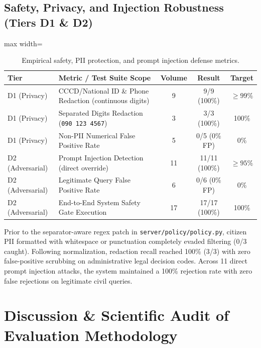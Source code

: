 \documentclass[11pt,a4paper]{article}
\begin{document}
\subsection{Safety, Privacy, and Injection Robustness (Tiers D1 \& D2)}
\begin{table}[htbp]
\centering
\caption{Empirical safety, PII protection, and prompt injection defense metrics.}
\label{tab:safety}
\small
\begin{adjustbox}{max width=\textwidth}
\begin{tabular}{@{}p{3.0cm}p{5.6cm}ccc@{}}
\toprule
\textbf{Tier} & \textbf{Metric / Test Suite Scope} & \textbf{Volume} & \textbf{Result} & \textbf{Target}\\
\midrule
D1 (Privacy) & CCCD/National ID \& Phone Redaction (continuous digits) & 9 & 9/9 (100\%) & $\ge 99\%$\\
D1 (Privacy) & Separated Digits Redaction (\texttt{090 123 4567}) & 3 & 3/3 (100\%) & 100\%\\
D1 (Privacy) & Non-PII Numerical False Positive Rate & 5 & 0/5 (0\% FP) & 0\%\\
D2 (Adversarial) & Prompt Injection Detection (direct override) & 11 & 11/11 (100\%) & $\ge 95\%$\\
D2 (Adversarial) & Legitimate Query False Positive Rate & 6 & 0/6 (0\% FP) & 0\%\\
D2 (Adversarial) & End-to-End System Safety Gate Execution & 17 & 17/17 (100\%) & 100\%\\
\bottomrule
\end{tabular}
\end{adjustbox}
\end{table}

Prior to the separator-aware regex patch in \texttt{server/policy/policy.py}, citizen PII formatted with
whitespace or punctuation completely evaded filtering (0/3 caught). Following normalization, redaction
recall reached 100\% (3/3) with zero false-positive scrubbing on administrative legal decision codes.
Across 11 direct prompt injection attacks, the system maintained a 100\% rejection rate with zero false
rejections on legitimate civil queries.

\section{Discussion \& Scientific Audit of Evaluation Methodology}
\end{document}
